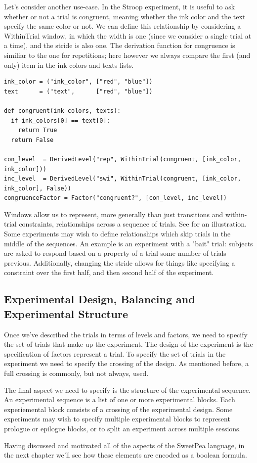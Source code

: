 Let's consider another use-case. In the Stroop experiment, it is useful to ask whether or not a trial is congruent, meaning whether the ink color and the text specify the same color or not. We can define this relationship by considering a WithinTrial window, in which the width is one (since we consider a single trial at a time), and the stride is also one. The derivation function for congruence is similiar to the one for repetitions; here however we always compare the first (and only) item in the ink colors and texts lists.

\begin{verbatim}
ink_color = ("ink_color", ["red", "blue"])
text      = ("text",      ["red", "blue"])

def congruent(ink_colors, texts):
  if ink_colors[0] == text[0]:
    return True
  return False

con_level  = DerivedLevel("rep", WithinTrial(congruent, [ink_color, ink_color]))
inc_level  = DerivedLevel("swi", WithinTrial(congruent, [ink_color, ink_color], False))
congruenceFactor = Factor("congruent?", [con_level, inc_level])

\end{verbatim}

Windows allow us to represent, more generally than just transitions and within-trial constraints, relationships across a sequence of trials. See  for an illustration. Some experiments may wish to define relationships which skip trials in the middle of the sequences. An example is an experiment with a "bait" trial: subjects are asked to respond based on a property of a trial some number of trials previous. Additionally, changing the stride allows for things like specifying a constraint over the first half, and then second half of the experiment.

\subsection{Experimental Design, Balancing and Experimental Structure}

Once we've described the trials in terms of levels and factors, we need to specify the set of trials that make up the experiment. The design of the experiment is the specification of factors represent a trial. To specify the set of trials in the experiment we need to specify the crossing of the design. As mentioned before, a full crossing is commonly, but not always, used.

The final aspect we need to specify is the structure of the experimental sequence. An experimental sequence is a list of one or more experimental blocks. Each experiemental block consists of a crossing of the experimental design. Some experiments may wish to specify multiple experimental blocks to represent prologue or epilogue blocks, or to split an experiment across multiple sessions.

Having discussed and motivated all of the aspects of the SweetPea language, in the next chapter we'll see how these elements are encoded as a boolean formula.
